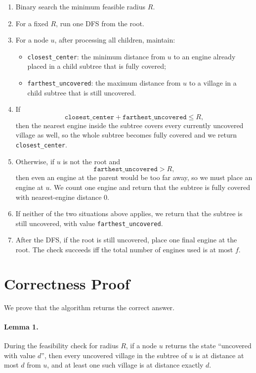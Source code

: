 \documentclass[11pt]{article}
\begin{document}
\begin{enumerate}[leftmargin=*]
    \item Binary search the minimum feasible radius $R$.

    \item For a fixed $R$, run one DFS from the root.

    \item For a node $u$, after processing all children, maintain:
    \begin{itemize}[leftmargin=*]
        \item \texttt{closest\_center}: the minimum distance from $u$ to an engine already placed in a child subtree that is fully covered;
        \item \texttt{farthest\_uncovered}: the maximum distance from $u$ to a village in a child subtree that is still uncovered.
    \end{itemize}

    \item If
    \[
    \texttt{closest\_center} + \texttt{farthest\_uncovered} \le R,
    \]
    then the nearest engine inside the subtree covers every currently uncovered village as well, so the whole subtree becomes fully covered and we return \texttt{closest\_center}.

    \item Otherwise, if $u$ is not the root and
    \[
    \texttt{farthest\_uncovered} > R,
    \]
    then even an engine at the parent would be too far away, so we must place an engine at $u$. We count one engine and return that the subtree is fully covered with nearest-engine distance $0$.

    \item If neither of the two situations above applies, we return that the subtree is still uncovered, with value \texttt{farthest\_uncovered}.

    \item After the DFS, if the root is still uncovered, place one final engine at the root. The check succeeds iff the total number of engines used is at most $f$.
\end{enumerate}

\section*{Correctness Proof}

We prove that the algorithm returns the correct answer.

\paragraph{Lemma 1.}
During the feasibility check for radius $R$, if a node $u$ returns the state ``uncovered with value $d$'', then every uncovered village in the subtree of $u$ is at distance at most $d$ from $u$, and at least one such village is at distance exactly $d$.
\end{document}
